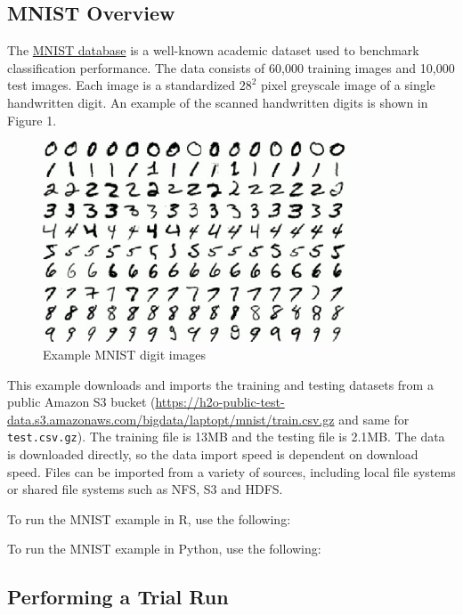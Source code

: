 {{\subsection{MNIST Overview} 

The \href{http://yann.lecun.com/exdb/mnist/}{MNIST database} is a well-known academic dataset used to benchmark classification performance.  The data consists of 60,000 training images and 10,000 test images. Each image is a standardized $28^2$ pixel greyscale image of a single handwritten digit.  An example of the scanned handwritten digits is shown in Figure 1. 

\begin{figure}[ht!]
\centering
\includegraphics[width=90mm]{./images/mnistdigits.jpg}
\caption{Example MNIST digit images \label{overflow}}
\end{figure}

This example downloads and imports the training and testing datasets from a public Amazon S3 bucket (\url{https://h2o-public-test-data.s3.amazonaws.com/bigdata/laptopt/mnist/train.csv.gz} and same for \texttt{test.csv.gz}).
The training file is 13MB and the testing file is 2.1MB. The data is downloaded directly, so the data import speed is dependent on download speed.  Files can be imported from a variety of sources, including local file systems or shared file systems such as NFS, S3 and HDFS.

\newpage
\waterExampleInR
To run the MNIST example in R, use the following: 


\waterExampleInPython
To run the MNIST example in Python, use the following: 


\subsection{Performing a Trial Run}
\label{ssec:TrialRun} 

}}
